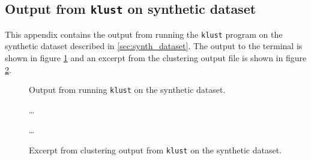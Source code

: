 \subsection{Output from \texttt{klust} on synthetic dataset}
\label{app:synth_dataset}

This appendix contains the output from running the \texttt{klust} program on
the synthetic dataset described in \ref{sec:synth_dataset}. The output to the
terminal is shown in figure \ref{fig:synth_silva_output} and an excerpt from
the clustering output file is shown in figure \ref{fig:synth_silva_clustering}.

\begin{figure}[H]
  \centering
  
  \caption{Output from running \texttt{klust} on the synthetic dataset.}
  \label{fig:synth_silva_output}
\end{figure}

\begin{figure}[H]
  \centering
  
  \dots
  
  \dots
  
  \caption{Excerpt from clustering output from \texttt{klust} on the
    synthetic dataset.}
  \label{fig:synth_silva_clustering}
\end{figure}
